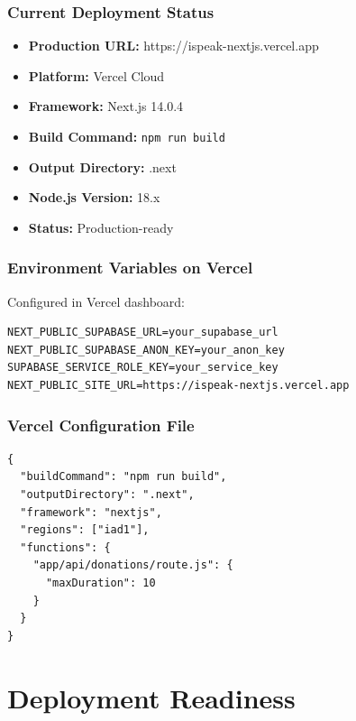 \documentclass[11pt,a4paper]{article}
\begin{document}
\subsubsection{Current Deployment Status}
\begin{itemize}[leftmargin=*,itemsep=3pt]
    \item \textbf{Production URL:} https://ispeak-nextjs.vercel.app
    \item \textbf{Platform:} Vercel Cloud
    \item \textbf{Framework:} Next.js 14.0.4
    \item \textbf{Build Command:} \texttt{npm run build}
    \item \textbf{Output Directory:} .next
    \item \textbf{Node.js Version:} 18.x
    \item \textbf{Status:} Production-ready
\end{itemize}

\subsubsection{Environment Variables on Vercel}
Configured in Vercel dashboard:
\begin{lstlisting}[caption=Vercel Environment Variables]
NEXT_PUBLIC_SUPABASE_URL=your_supabase_url
NEXT_PUBLIC_SUPABASE_ANON_KEY=your_anon_key
SUPABASE_SERVICE_ROLE_KEY=your_service_key
NEXT_PUBLIC_SITE_URL=https://ispeak-nextjs.vercel.app
\end{lstlisting}

\subsubsection{Vercel Configuration File}
\begin{lstlisting}[caption=vercel.json Configuration]
{
  "buildCommand": "npm run build",
  "outputDirectory": ".next",
  "framework": "nextjs",
  "regions": ["iad1"],
  "functions": {
    "app/api/donations/route.js": {
      "maxDuration": 10
    }
  }
}
\end{lstlisting}

\section{Deployment Readiness}
\end{document}
